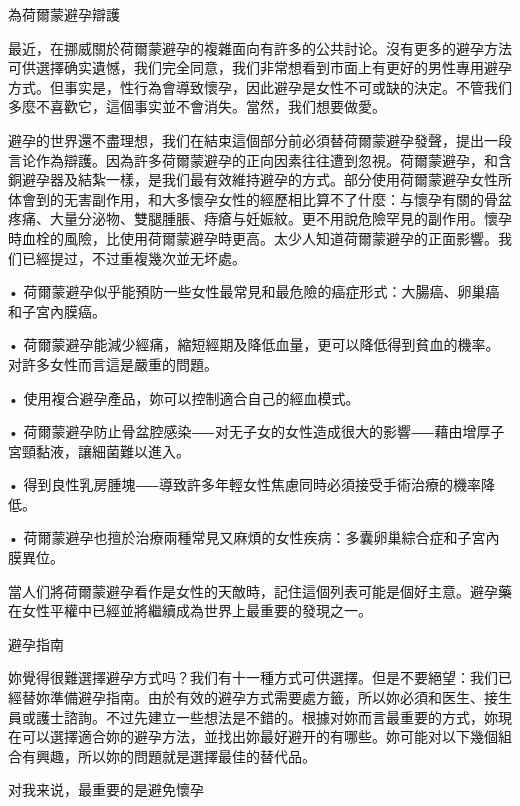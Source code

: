 \documentclass[12pt,UTF8]{ctexbook}
\begin{document}
為荷爾蒙避孕辯護




最近，在挪威關於荷爾蒙避孕的複雜面向有許多的公共討论。沒有更多的避孕方法可供選擇确实遺憾，我们完全同意，我们非常想看到市面上有更好的男性專用避孕方式。但事实是，性行為會導致懷孕，因此避孕是女性不可或缺的決定。不管我们多麼不喜歡它，這個事实並不會消失。當然，我们想要做愛。

避孕的世界還不盡理想，我们在結束這個部分前必須替荷爾蒙避孕發聲，提出一段言论作為辯護。因為許多荷爾蒙避孕的正向因素往往遭到忽視。荷爾蒙避孕，和含銅避孕器及結紮一樣，是我们最有效維持避孕的方式。部分使用荷爾蒙避孕女性所体會到的无害副作用，和大多懷孕女性的經歷相比算不了什麼：与懷孕有關的骨盆疼痛、大量分泌物、雙腿腫脹、痔瘡与妊娠紋。更不用說危險罕見的副作用。懷孕時血栓的風險，比使用荷爾蒙避孕時更高。太少人知道荷爾蒙避孕的正面影響。我们已經提过，不过重複幾次並无坏處。



• 荷爾蒙避孕似乎能預防一些女性最常見和最危險的癌症形式：大腸癌、卵巢癌和子宮內膜癌。

• 荷爾蒙避孕能減少經痛，縮短經期及降低血量，更可以降低得到貧血的機率。对許多女性而言這是嚴重的問題。

• 使用複合避孕產品，妳可以控制適合自己的經血模式。

• 荷爾蒙避孕防止骨盆腔感染⸺对无子女的女性造成很大的影響⸺藉由增厚子宮頸黏液，讓細菌難以進入。

• 得到良性乳房腫塊⸺導致許多年輕女性焦慮同時必須接受手術治療的機率降低。

• 荷爾蒙避孕也擅於治療兩種常見又麻煩的女性疾病：多囊卵巢綜合症和子宮內膜異位。



當人们將荷爾蒙避孕看作是女性的天敵時，記住這個列表可能是個好主意。避孕藥在女性平權中已經並將繼續成為世界上最重要的發現之一。





避孕指南




妳覺得很難選擇避孕方式吗？我们有十一種方式可供選擇。但是不要絕望：我们已經替妳準備避孕指南。由於有效的避孕方式需要處方籤，所以妳必須和医生、接生員或護士諮詢。不过先建立一些想法是不錯的。根據对妳而言最重要的方式，妳現在可以選擇適合妳的避孕方法，並找出妳最好避开的有哪些。妳可能对以下幾個組合有興趣，所以妳的問題就是選擇最佳的替代品。





对我来说，最重要的是避免懷孕
\end{document}
